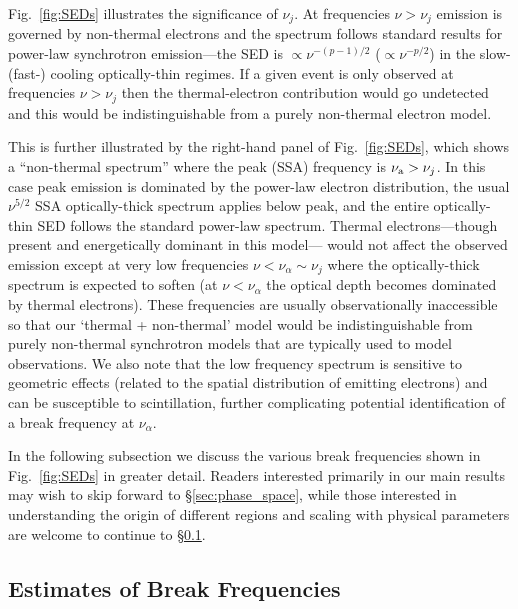 \documentclass[twocolumn]{aastex63}
\begin{document}
Fig.~\ref{fig:SEDs} illustrates the significance of $\nu_j$. At frequencies $\nu > \nu_j$ emission is governed by non-thermal electrons and the spectrum follows standard results for power-law synchrotron emission---the SED is $\propto \nu^{-(p-1)/2}$ ($\propto \nu^{-p/2}$) in the slow- (fast-) cooling optically-thin regimes.
If a given event is only observed at frequencies $\nu > \nu_j$ then the thermal-electron contribution would go undetected and this would be indistinguishable from a purely non-thermal electron model.

This is further illustrated by the right-hand panel of Fig.~\ref{fig:SEDs}, which shows a ``non-thermal spectrum'' where the peak (SSA) frequency is $\nu_{\rm a} > \nu_j$. In this case peak emission is dominated by the power-law electron distribution, the usual $\nu^{5/2}$ SSA optically-thick spectrum applies below peak, and the entire optically-thin SED follows the standard power-law spectrum. Thermal electrons---though present and energetically dominant in this model--- would not affect the observed emission except at very low frequencies $\nu < \nu_\alpha \sim \nu_j$ where the optically-thick spectrum is expected to soften (at $\nu < \nu_\alpha$ the optical depth becomes dominated by thermal electrons). These frequencies are usually observationally inaccessible so that our `thermal + non-thermal' model would be indistinguishable from purely non-thermal synchrotron models that are typically used to model observations.
We also note that the low frequency spectrum is sensitive to geometric effects (related to the spatial distribution of emitting electrons) and can be susceptible to scintillation, further complicating potential identification of a break frequency at $\nu_\alpha$.

In the following subsection we discuss the various break frequencies shown in Fig.~\ref{fig:SEDs} in greater detail. Readers interested primarily in our main results may wish to skip forward to \S\ref{sec:phase_space}, while those interested in understanding the origin of different regions and scaling with physical parameters are welcome to continue to \S\ref{sec:break_frequencies}.


\subsection{Estimates of Break Frequencies}
\label{sec:break_frequencies}
\end{document}
